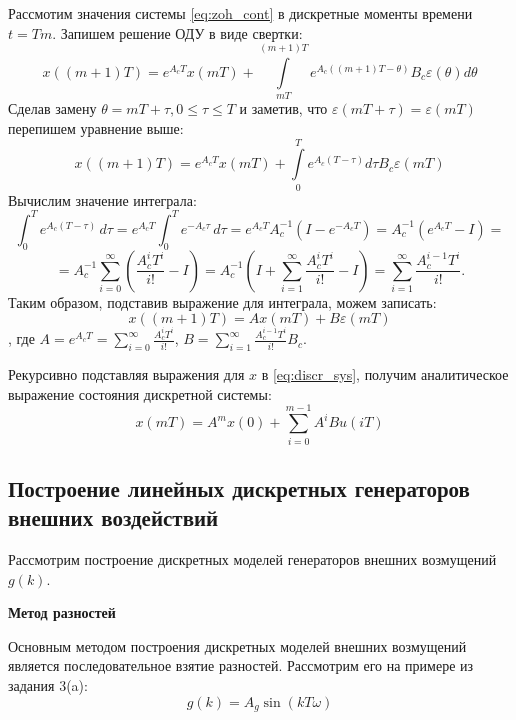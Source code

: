 \documentclass[a4paper, 14pt]{extarticle}
\theoremstyle{definition}
\theoremstyle{plain}
\theoremstyle{remark}
\begin{document}
Рассмотим значения системы \ref{eq:zoh_cont} в дискретные моменты времени $t = Tm$. Запишем решение ОДУ в виде свертки:
\begin{equation*}
	x((m+1)T) = e^{A_cT}x(mT) + \int\limits_{mT}^{(m+1)T}e^{A_c((m+1)T-\theta)}B_c\varepsilon(\theta)d\theta
\end{equation*}
Сделав замену $\theta=mT + \tau, 0\le\tau\le T$ и заметив, что $\varepsilon(mT + \tau) = \varepsilon(mT)$ перепишем уравнение выше:
\begin{equation*}
	x((m+1)T) = e^{A_cT}x(mT) + \int\limits_{0}^{T}e^{A_c(T-\tau)}d\tau B_c\varepsilon(mT)
\end{equation*}
Вычислим значение интеграла:
\begin{equation*}
	\int_0^T e^{A_c (T - \tau)} \, d\tau = e^{A_c T} \int_0^T e^{-A_c \tau} \, d\tau = e^{A_c T} A_c^{-1} \left( I - e^{-A_c T} \right) = A_c^{-1} \left( e^{A_c T} - I \right)=
\end{equation*}
\begin{equation*}
	= A_c^{-1} \sum_{i=0}^{\infty} \left( \frac{A_c^i T^i}{i!} - I \right) = A_c^{-1} \left( I + \sum_{i=1}^{\infty} \frac{A_c^i T^i}{i!} - I \right) = \sum_{i=1}^{\infty} \frac{A_c^{i-1} T^i}{i!}.
\end{equation*}
Таким образом, подставив выражение для интеграла, можем записать:
\begin{equation}\label{eq:discr_sys}
	x((m+1)T) = Ax(mT) + B\varepsilon(mT)
\end{equation}
, где $A = e^{A_cT}=\sum\limits_{i=0}^{\infty}\frac{A_c^iT^i}{i!}$, $B = \sum\limits_{i=1}^{\infty}\frac{A_c^{i-1}T^i}{i!}B_c$.

Рекурсивно подставляя выражения для $x$ в \ref{eq:discr_sys}, получим аналитическое выражение состояния дискретной системы:
\begin{equation}
	x(mT)=A^mx(0) + \sum\limits_{i=0}^{m-1}A^iBu(iT)
\end{equation}

\subsection{Построение линейных дискретных генераторов внешних воздействий}
Рассмотрим построение дискретных моделей генераторов внешних возмущений $g(k)$.

\textbf{Метод разностей}

Основным методом построения дискретных моделей внешних возмущений является последовательное взятие разностей. Рассмотрим его на примере из задания 3(a):
\begin{equation}\label{eq:gen1}
	g(k) = A_g\sin(kT\omega)
\end{equation}
\end{document}

